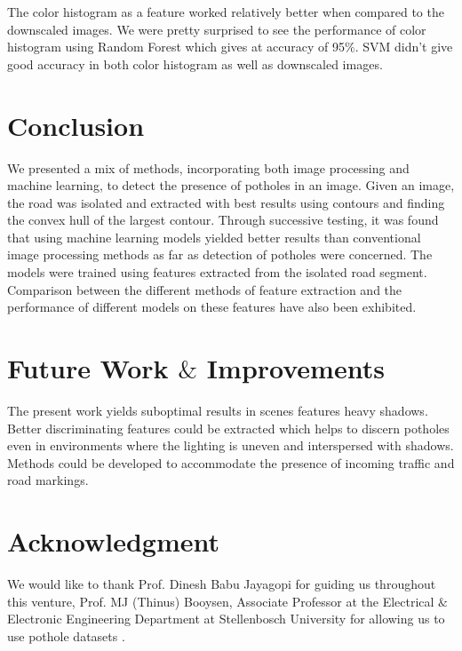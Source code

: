 \documentclass[journal]{IEEEtran}
\begin{document}
The color histogram as a feature worked relatively better when compared to the downscaled images. We were pretty surprised to see the performance of color histogram using Random Forest which gives at accuracy of 
95$\%$. SVM didn't give good accuracy in both color histogram as well as downscaled images.

\section{Conclusion}
We presented a mix of methods, incorporating both image processing and machine learning, to detect the presence of potholes in an image. Given an image, the road was isolated and extracted with best results using contours and finding the convex hull of the largest contour. Through successive testing, it was found that using machine learning models yielded better results than conventional image processing methods as far as detection of potholes were concerned. The models were trained using features extracted from the isolated road segment. Comparison between the different methods of feature extraction and the performance of different models on these features have also been exhibited.

\section{Future Work $\&$ Improvements}
The present work yields sub\-optimal results in scenes features heavy shadows. Better discriminating features could be extracted which helps to discern potholes even in environments where the lighting is uneven and interspersed with shadows. Methods could be developed to accommodate the presence of incoming traffic and road markings.

%


\section*{Acknowledgment}
We would like to thank Prof. Dinesh Babu Jayagopi for guiding us throughout this venture, Prof. MJ (Thinus) Booysen, Associate Professor at the Electrical $\&$ Electronic Engineering Department at Stellenbosch University for allowing us to use pothole datasets \cite{dataset}.
\end{document}
